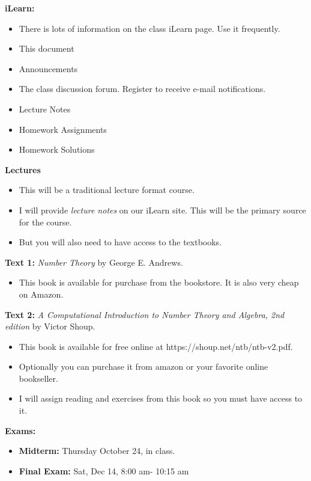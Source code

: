 \documentclass[oneside,12pt]{amsart}
\begin{document}
\bigskip

\textbf{iLearn:}
\begin{itemize}
\item There is lots of information on the class iLearn page. Use it frequently.
\item This document
\item Announcements
\item The class discussion forum. Register to receive e-mail notifications.
\item Lecture Notes
\item Homework Assignments
\item Homework Solutions
\end{itemize}

\bigskip

\textbf{Lectures}
\begin{itemize}
\item This will be a traditional lecture format course.
\item I will provide \emph{lecture notes} on our iLearn site. This will be the primary source for the course.
\item But you will also need to have access to the textbooks.
\end{itemize}

\bigskip

\textbf{Text 1:} \emph{Number Theory} by George E. Andrews.
\begin{itemize}
\item This book is available for purchase from the bookstore. It is also very cheap on Amazon.
\end{itemize}

\bigskip

\textbf{Text 2:} \emph{A Computational Introduction to Number Theory and Algebra, 2nd edition} by Victor Shoup.
\begin{itemize}
\item This book is available for free online at https://shoup.net/ntb/ntb-v2.pdf.
\item Optionally you can purchase it from amazon or your favorite online bookseller.
\item I will assign reading and exercises from this book so you must have access to it.
\end{itemize}

\bigskip

\textbf{Exams:}
\begin{itemize}
\item \textbf{Midterm:} Thursday October 24, in class.
\item \textbf{Final Exam:} Sat, Dec 14, 8:00 am- 10:15 am
\end{itemize}
\end{document}
